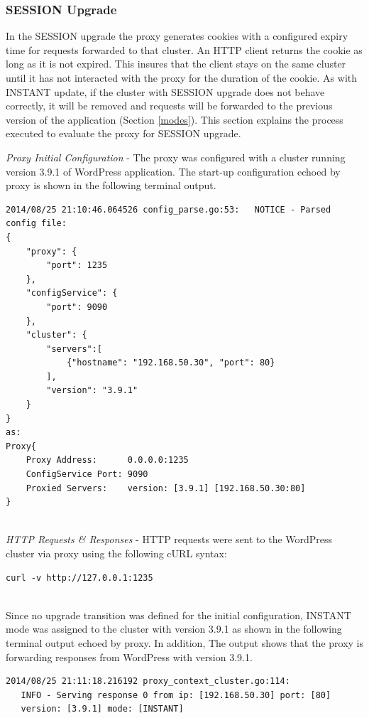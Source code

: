 \documentclass[a4paper,11pt,twoside]{report}
\begin{document}
\subsubsection*{SESSION Upgrade}
In the SESSION upgrade the proxy generates cookies with a configured expiry time for requests forwarded to that cluster. An HTTP client returns the cookie as long as it is not expired. This insures that the client stays on the same cluster until it has not interacted with the proxy for the duration of the cookie. As with INSTANT update, if the cluster with SESSION upgrade does not behave correctly, it will be removed and requests will be forwarded to the previous version of the application (Section \ref{modes}). This section explains the process executed to evaluate the proxy for SESSION upgrade.\medskip

\noindent
\textit{Proxy Initial Configuration} - The proxy was configured with a cluster running version 3.9.1 of WordPress application. The start-up configuration echoed by proxy is shown in the following terminal output.\smallskip

\begin{lstlisting}[language=terminal]
2014/08/25 21:10:46.064526 config_parse.go:53:   NOTICE - Parsed config file:
{
    "proxy": {
        "port": 1235
    },
    "configService": {
        "port": 9090
    },
    "cluster": {
        "servers":[
            {"hostname": "192.168.50.30", "port": 80}
        ],
        "version": "3.9.1"
    }
}
as:
Proxy{
	Proxy Address:      0.0.0.0:1235
	ConfigService Port: 9090
	Proxied Servers:    version: [3.9.1] [192.168.50.30:80]
}
\end{lstlisting}

\noindent \\
\textit{HTTP Requests \& Responses} - HTTP requests were sent to the WordPress cluster via proxy using the following cURL syntax:\smallskip  

\begin{lstlisting}[language=terminal]
curl -v http://127.0.0.1:1235
\end{lstlisting} 

\noindent\\Since no upgrade transition was defined for the initial configuration, INSTANT mode was assigned to the cluster with version 3.9.1 as shown in the following terminal output echoed by proxy. In addition, The output shows that the proxy is forwarding responses from WordPress with version 3.9.1. \smallskip

\begin{lstlisting}[language=terminal] 
2014/08/25 21:11:18.216192 proxy_context_cluster.go:114:     
   INFO - Serving response 0 from ip: [192.168.50.30] port: [80] 
   version: [3.9.1] mode: [INSTANT]
\end{lstlisting} 
\end{document}
